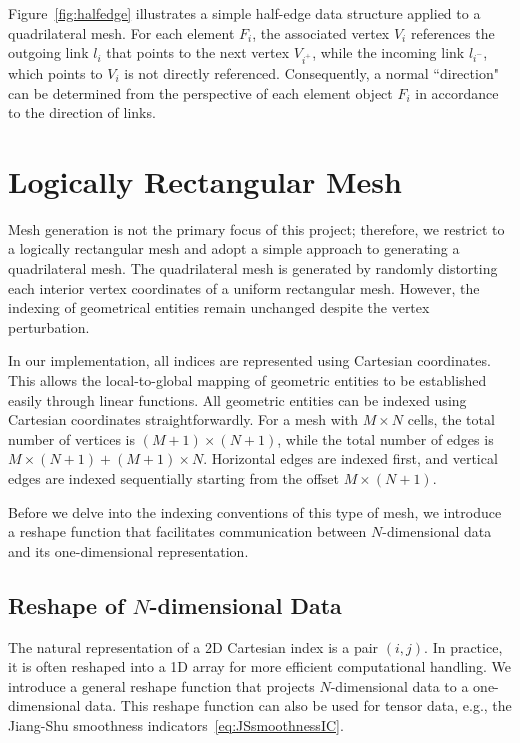 Figure~\ref{fig:halfedge} illustrates a simple half-edge 
data structure applied to a quadrilateral mesh. 
For each element $F_i$,
the associated vertex $V_i$ references the outgoing link $l_i$ that points to the next vertex $V_{i^+}$,
while the incoming link $l_{i^-}$, which points to $V_i$  is not directly referenced.
Consequently, a normal ``direction" can be determined from the perspective of each element object $F_i$ in 
accordance to the direction of links.

\section{Logically Rectangular Mesh}
Mesh generation is not the primary focus of this project; therefore,
we restrict to a logically rectangular mesh and adopt a simple approach to
generating a quadrilateral mesh.
The quadrilateral mesh is generated by randomly distorting each 
interior vertex coordinates of a uniform rectangular mesh.
However, the indexing of geometrical entities remain unchanged despite
the vertex perturbation.

In our implementation, all indices are represented using Cartesian coordinates.
This allows the local-to-global mapping of geometric entities to be established easily through linear functions.
All geometric entities can be indexed using Cartesian coordinates straightforwardly.
For a mesh with $M\times N$ cells, the total number of vertices
is $(M+1)\times (N+1)$, while the total number of edges is 
$M\times (N+1) + (M+1)\times N $. 
Horizontal edges are indexed first, and vertical edges are indexed
sequentially starting from the offset $M\times (N+1)$.

Before we delve into the indexing conventions of this type of mesh,
we introduce a reshape function that facilitates communication between $N$-dimensional data
and its one-dimensional representation.

\subsection{Reshape of $N$-dimensional Data}
The natural representation of a 2D Cartesian index is a pair $(i,j)$. 
In practice,
it is often reshaped into a 1D array for more efficient
computational handling. We introduce a general reshape function
that projects $N$-dimensional data to a one-dimensional data. 
This reshape function can also be used for tensor data, e.g., the Jiang-Shu smoothness
indicators~\eqref{eq:JSsmoothnessIC}.


